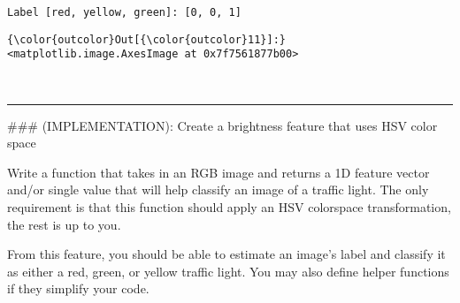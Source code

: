 \documentclass[11pt]{article}
\begin{document}
    \begin{Verbatim}[commandchars=\\\{\}]
Label [red, yellow, green]: [0, 0, 1]

    \end{Verbatim}

\begin{Verbatim}[commandchars=\\\{\}]
{\color{outcolor}Out[{\color{outcolor}11}]:} <matplotlib.image.AxesImage at 0x7f7561877b00>
\end{Verbatim}
            
    \begin{center}
    \end{center}
    { \hspace*{\fill} \\}
    
    \begin{center}\rule{0.5\linewidth}{\linethickness}\end{center}

 \#\#\# (IMPLEMENTATION): Create a brightness feature that uses HSV
color space

Write a function that takes in an RGB image and returns a 1D feature
vector and/or single value that will help classify an image of a traffic
light. The only requirement is that this function should apply an HSV
colorspace transformation, the rest is up to you.

From this feature, you should be able to estimate an image's label and
classify it as either a red, green, or yellow traffic light. You may
also define helper functions if they simplify your code.
\end{document}
